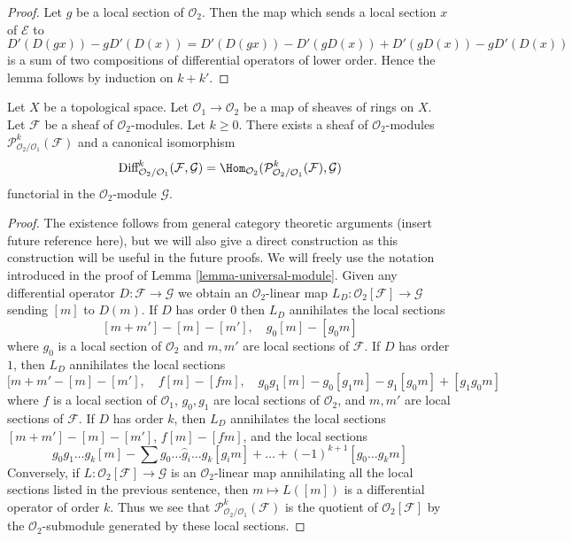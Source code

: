 \begin{proof}
Let $g$ be a local section of $\mathcal{O}_2$.
Then the map which sends a local section $x$ of $\mathcal{E}$ to
$$
D'(D(gx)) - gD'(D(x)) = D'(D(gx)) - D'(gD(x)) + D'(gD(x)) - gD'(D(x))
$$
is a sum of two compositions of differential operators of lower order.
Hence the lemma follows by induction on $k + k'$.
\end{proof}

\begin{lemma}
\label{lemma-module-principal-parts}
Let $X$ be a topological space.
Let $\mathcal{O}_1 \to \mathcal{O}_2$ be a map of sheaves of rings on $X$.
Let $\mathcal{F}$ be a sheaf of $\mathcal{O}_2$-modules.
Let $k \geq 0$. There exists a sheaf of $\mathcal{O}_2$-modules
$\mathcal{P}^k_{\mathcal{O}_2/\mathcal{O}_1}(\mathcal{F})$
and a canonical isomorphism
$$
\text{Diff}^k_{\mathcal{O}_2/\mathcal{O}_1}(\mathcal{F}, \mathcal{G}) =
\Hom_{\mathcal{O}_2}(
\mathcal{P}^k_{\mathcal{O}_2/\mathcal{O}_1}(\mathcal{F}), \mathcal{G})
$$
functorial in the $\mathcal{O}_2$-module $\mathcal{G}$.
\end{lemma}

\begin{proof}
The existence follows from general category theoretic arguments
(insert future reference here), but we will also give a direct
construction as this construction will be useful in the future proofs.
We will freely use the notation introduced in the proof of
Lemma \ref{lemma-universal-module}.
Given any differential operator $D : \mathcal{F} \to \mathcal{G}$
we obtain an $\mathcal{O}_2$-linear map
$L_D : \mathcal{O}_2[\mathcal{F}] \to \mathcal{G}$
sending $[m]$ to $D(m)$. If $D$ has order $0$
then $L_D$ annihilates the local sections
$$
[m + m'] - [m] - [m'],\quad
g_0[m] - [g_0m]
$$
where $g_0$ is a local section of $\mathcal{O}_2$ and $m, m'$
are local sections of $\mathcal{F}$. If $D$ has order $1$, then $L_D$
annihilates the local sections
$$
[m + m' - [m] - [m'],\quad
f[m] - [fm], \quad
g_0g_1[m] - g_0[g_1m] - g_1[g_0m] + [g_1g_0m]
$$
where $f$ is a local section of $\mathcal{O}_1$,
$g_0, g_1$ are local sections of $\mathcal{O}_2$, and
$m, m'$ are local sections of $\mathcal{F}$.
If $D$ has order $k$, then $L_D$ annihilates the local sections
$[m + m'] - [m] - [m']$, $f[m] - [fm]$, and the local sections
$$
g_0g_1\ldots g_k[m] - \sum g_0 \ldots \hat g_i \ldots g_k[g_im] + \ldots
+(-1)^{k + 1}[g_0\ldots g_km]
$$
Conversely, if $L : \mathcal{O}_2[\mathcal{F}] \to \mathcal{G}$ is an
$\mathcal{O}_2$-linear map annihilating all the local sections
listed in the previous sentence, then $m \mapsto L([m])$ is a
differential operator of order $k$. Thus we see that
$\mathcal{P}^k_{\mathcal{O}_2/\mathcal{O}_1}(\mathcal{F})$
is the quotient of $\mathcal{O}_2[\mathcal{F}]$
by the $\mathcal{O}_2$-submodule generated by these local sections.
\end{proof}


